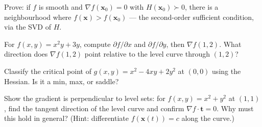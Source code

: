 \begin{exercise}[hard]
Prove: if $f$ is smooth and $\nabla f(\mathbf x_0)=0$ with $H(\mathbf
x_0)\succ0$, there is a neighbourhood where $f(\mathbf x)>f(\mathbf x_0)$
--- the second-order sufficient condition, via the SVD of $H$.
\end{exercise}
\begin{exercise}[easy]
For $f(x,y)=x^{2}y+3y$, compute $\partial f/\partial x$ and
$\partial f/\partial y$, then $\nabla f(1,2)$. What direction does
$\nabla f(1,2)$ point relative to the level curve through $(1,2)$?
\end{exercise}
\begin{exercise}[medium]
Classify the critical point of $g(x,y)=x^{2}-4xy+2y^{2}$ at
$(0,0)$ using the Hessian. Is it a min, max, or saddle?
\end{exercise}
\begin{exercise}[hard]
Show the gradient is perpendicular to level sets: for
$f(x,y)=x^{2}+y^{2}$ at $(1,1)$, find the tangent direction of the
level curve and confirm $\nabla f\cdot\mathbf t=0$. Why must this
hold in general? (Hint: differentiate $f(\mathbf{x}(t))=c$ along the
curve.)
\end{exercise}

